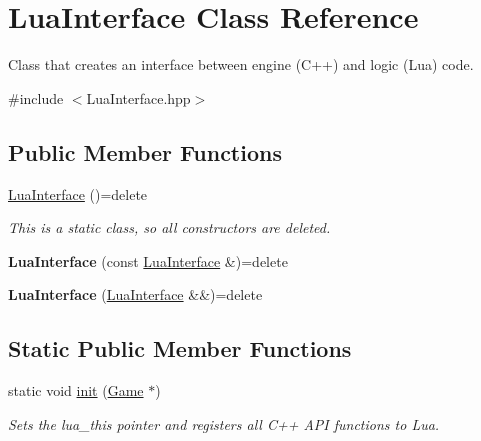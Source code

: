 \hypertarget{class_lua_interface}{}\section{Lua\+Interface Class Reference}
\label{class_lua_interface}


Class that creates an interface between engine (C++) and logic (Lua) code.  




{\ttfamily \#include $<$Lua\+Interface.\+hpp$>$}

\subsection*{Public Member Functions}
\begin{DoxyCompactItemize}
\item 
\hyperlink{class_lua_interface_a10d0df765a9d8c8282c18a5ce43d0f9e}{Lua\+Interface} ()=delete
\begin{DoxyCompactList}\small\item\em This is a static class, so all constructors are deleted. \end{DoxyCompactList}\item 
{\bfseries Lua\+Interface} (const \hyperlink{class_lua_interface}{Lua\+Interface} \&)=delete\hypertarget{class_lua_interface_a925145fb427267abcff404742e1df805}{}\label{class_lua_interface_a925145fb427267abcff404742e1df805}

\item 
{\bfseries Lua\+Interface} (\hyperlink{class_lua_interface}{Lua\+Interface} \&\&)=delete\hypertarget{class_lua_interface_ad7b50588c30ea8c133539efd4f532180}{}\label{class_lua_interface_ad7b50588c30ea8c133539efd4f532180}

\end{DoxyCompactItemize}
\subsection*{Static Public Member Functions}
\begin{DoxyCompactItemize}
\item 
static void \hyperlink{class_lua_interface_ac9fa6b609503a1db2c44b7f27f8d1090}{init} (\hyperlink{class_game}{Game} $\ast$)
\begin{DoxyCompactList}\small\item\em Sets the lua\+\_\+this pointer and registers all C++ A\+PI functions to Lua. \end{DoxyCompactList}\end{DoxyCompactItemize}
